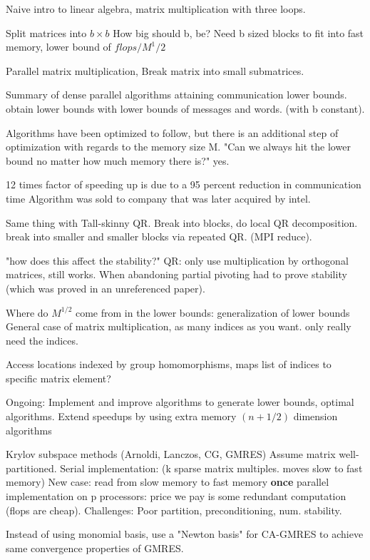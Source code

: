 \begin{description}
{\begin{description}
Naive intro to linear algebra, matrix multiplication with three loops.

Split matrices into $b \times b$
How big should b, be?
Need b sized blocks to fit into fast memory, lower bound of $flops/M^1/2$

Parallel matrix multiplication,
Break matrix into small submatrices.

Summary of dense parallel algorithms attaining communication lower bounds.
obtain lower bounds with lower bounds of messages and words. (with b constant).

Algorithms have been optimized to follow, but there is an additional step of
optimization with regards to the memory size M.
"Can we always hit the lower bound no matter how much memory there is?" yes.


12 times factor of speeding up is due to a 95 percent reduction in communication time
Algorithm was sold to company that was later acquired by intel.

Same thing with Tall-skinny QR.
Break into blocks, do local QR decomposition. break into smaller and smaller blocks
via repeated QR. (MPI reduce).

"how does this affect the stability?"
QR: only use multiplication by orthogonal matrices, still works.
When abandoning partial pivoting had to prove stability (which was proved in an
unreferenced paper).

Where do $M^{1/2}$ come from in the lower bounds: generalization of lower bounds
General case of matrix multiplication, as many indices as you want. only really need the
indices.

Access locations indexed by group homomorphisms, maps list of indices
to specific matrix element?

Ongoing: Implement and improve algorithms to generate lower bounds, optimal algorithms.
Extend speedups by using extra memory $(n+1/2)$ dimension algorithms

Krylov subspace methods
(Arnoldi, Lanczos, CG, GMRES)
Assume matrix well-partitioned.
Serial implementation: (k sparse matrix multiples. moves slow to fast memory)
New case: read from slow memory to fast memory \textbf{once}
parallel implementation on p processors: price we pay is some redundant computation
(flops are cheap).
Challenges: Poor partition, preconditioning, num. stability.

Instead of using monomial basis, use a "Newton basis" for CA-GMRES to achieve same
convergence properties of GMRES.


\end{description}}
\end{description}
